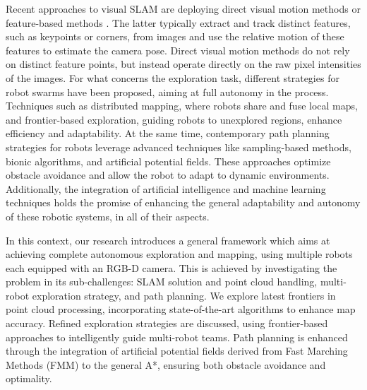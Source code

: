 Recent approaches to visual SLAM are deploying direct visual motion methods or feature-based methods \cite{macario2022comprehensive}. The latter typically extract and track distinct features, such as keypoints or corners, from images and use the relative motion of these features to estimate the camera pose. Direct visual motion methods do not rely on distinct feature points, but instead operate directly on the raw pixel intensities of the images. 
For what concerns the exploration task, different strategies for robot swarms have been proposed, aiming at full autonomy in the process. Techniques such as distributed mapping, where robots share and fuse local maps, and frontier-based exploration, guiding robots to unexplored regions, enhance efficiency and adaptability. 
At the same time, contemporary path planning strategies for robots leverage advanced techniques like sampling-based methods, bionic algorithms, and artificial potential fields. These approaches optimize obstacle avoidance and allow the robot to adapt to dynamic environments.
Additionally, the integration of artificial intelligence and machine learning techniques holds the promise of enhancing the general adaptability and autonomy of these robotic systems, in all of their aspects.


In this context, our research introduces a general framework which aims at achieving complete autonomous exploration and mapping, using multiple robots each equipped with an RGB-D camera. This is achieved by investigating the problem in its sub-challenges: SLAM solution and point cloud handling, multi-robot exploration strategy, and path planning.
We explore latest frontiers in point cloud processing, incorporating state-of-the-art algorithms to enhance map accuracy. Refined exploration strategies are discussed, using frontier-based approaches to intelligently guide multi-robot teams. Path planning is enhanced through the integration of artificial potential fields derived from Fast Marching Methods (FMM) to the general A*, ensuring both obstacle avoidance and optimality.


